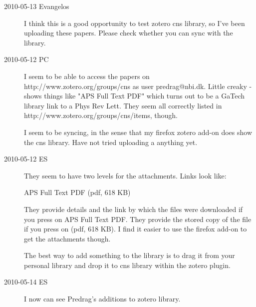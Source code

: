 \begin{description}
\item[2010-05-13 Evangelos]
I think this is a good opportunity to test zotero cns library, so I've been uploading these
papers. Please check whether you can sync with the library.

\item[2010-05-12 PC] I seem to be able to access the papers on
{http://www.zotero.org/groups/cns} as user predrag@nbi.dk. Little creaky
- shows things like "APS Full Text PDF" which turns out to be a GaTech
library link to a Phys Rev Lett. They seem all correctly listed in
{http://www.zotero.org/groups/cns/items}, though.

I seem to be syncing, in the sense that my firefox zotero add-on
does show the cns library. Have not tried uploading a
anything yet.

\item[2010-05-12 ES] They seem to have two levels for the attachments.
Links look like:

APS Full Text PDF  (pdf, 618 KB)

They provide details and the link by which the files were downloaded if you press
on APS Full Text PDF. They provide the stored copy of the file if you press
on (pdf, 618 KB). I find it easier to use the firefox add-on to get the attachments though.

The best  way to add something to the library
is to drag it from your personal library and drop it to cns library within the zotero plugin.

\item[2010-05-14 ES]

I now can see Predrag's additions to zotero library.




\end{description}
